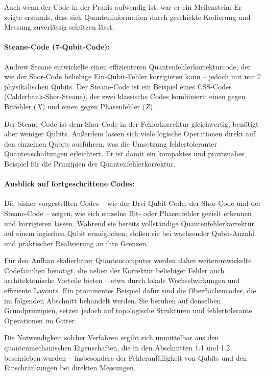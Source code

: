 Auch wenn der Code in der Praxis aufwendig ist, war er ein Meilenstein: Er zeigte erstmals, dass sich Quanteninformation durch geschickte Kodierung und Messung zuverlässig schützen lässt.\\

\paragraph{Steane-Code (7-Qubit-Code):}

Andrew Steane entwickelte einen effizienteren Quantenfehlerkorrekturcode, der wie der Shor-Code beliebige Ein-Qubit-Fehler korrigieren kann – jedoch mit nur 7 physikalischen Qubits. Der Steane-Code ist ein Beispiel eines CSS-Codes (Calderbank-Shor-Steane), der zwei klassische Codes kombiniert: einen gegen Bitfehler (\(X\)) und einen gegen Phasenfehler (\(Z\)).

Der Steane-Code ist dem Shor-Code in der Fehlerkorrektur gleichwertig, benötigt aber weniger Qubits. Außerdem lassen sich viele logische Operationen direkt auf den einzelnen Qubits ausführen, was die Umsetzung fehlertoleranter Quantenschaltungen erleichtert. Er ist damit ein kompaktes und praxisnahes Beispiel für die Prinzipien der Quantenfehlerkorrektur.\\

\paragraph{Ausblick auf fortgeschrittene Codes:}

Die bisher vorgestellten Codes – wie der Drei-Qubit-Code, der Shor-Code und der Steane-Code – zeigen, wie sich einzelne Bit- oder Phasenfehler gezielt erkennen und korrigieren lassen. Während sie bereits vollständige Quantenfehlerkorrektur auf einem logischen Qubit ermöglichen, stoßen sie bei wachsender Qubit-Anzahl und praktischer Realisierung an ihre Grenzen.

Für den Aufbau skalierbarer Quantencomputer werden daher weiterentwickelte Codefamilien benötigt, die neben der Korrektur beliebiger Fehler auch architektonische Vorteile bieten – etwa durch lokale Wechselwirkungen und effiziente Layouts. Ein prominentes Beispiel dafür sind die Oberflächencodes, die im folgenden Abschnitt behandelt werden. Sie beruhen auf denselben Grundprinzipien, setzen jedoch auf topologische Strukturen und fehlertolerante Operationen im Gitter.

Die Notwendigkeit solcher Verfahren ergibt sich unmittelbar aus den quantenmechanischen Eigenschaften, die in den Abschnitten 1.1 und 1.2 beschrieben wurden – insbesondere der Fehleranfälligkeit von Qubits und den Einschränkungen bei direkten Messungen.

